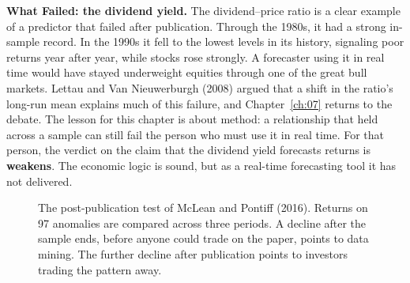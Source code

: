 \begin{callout}
\textbf{What Failed: the dividend yield.} The dividend--price ratio is a clear example of a predictor that failed after publication. Through the 1980s, it had a strong in-sample record. In the 1990s it fell to the lowest levels in its history, signaling poor returns year after year, while stocks rose strongly. A forecaster using it in real time would have stayed underweight equities through one of the great bull markets. Lettau and Van Nieuwerburgh (2008) argued that a shift in the ratio's long-run mean explains much of this failure, and Chapter~\ref{ch:07} returns to the debate. The lesson for this chapter is about method: a relationship that held across a sample can still fail the person who must use it in real time. For that person, the verdict on the claim that the dividend yield forecasts returns is \textbf{weakens}. The economic logic is sound, but as a real-time forecasting tool it has not delivered.
\end{callout}


\begin{figure}[htbp]
  \centering
  \caption{The post-publication test of McLean and Pontiff (2016). Returns on
    97 anomalies are compared across three periods. A decline after the sample
    ends, before anyone could trade on the paper, points to data mining. The
    further decline after publication points to investors trading the pattern
    away.}
  \label{fig:05-postpub}
\end{figure}

